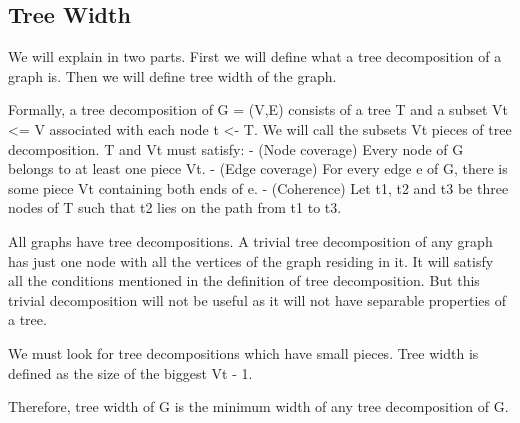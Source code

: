 \hypertarget{tree-width}{%
\subsection{Tree Width}\label{tree-width}}

We will explain in two parts. First we will define what a tree
decomposition of a graph is. Then we will define tree width of the
graph.

Formally, a tree decomposition of G = (V,E) consists of a tree T and a
subset Vt \textless= V associated with each node t \textless- T. We will
call the subsets Vt pieces of tree decomposition. T and Vt must satisfy:
- (Node coverage) Every node of G belongs to at least one piece Vt. -
(Edge coverage) For every edge e of G, there is some piece Vt containing
both ends of e. - (Coherence) Let t1, t2 and t3 be three nodes of T such
that t2 lies on the path from t1 to t3.

All graphs have tree decompositions. A trivial tree decomposition of any
graph has just one node with all the vertices of the graph residing in
it. It will satisfy all the conditions mentioned in the definition of
tree decomposition. But this trivial decomposition will not be useful as
it will not have separable properties of a tree.

We must look for tree decompositions which have small pieces.
Tree width is defined as the size of the biggest Vt - 1.

Therefore, tree width of G is the minimum width of any tree decomposition
of G.
